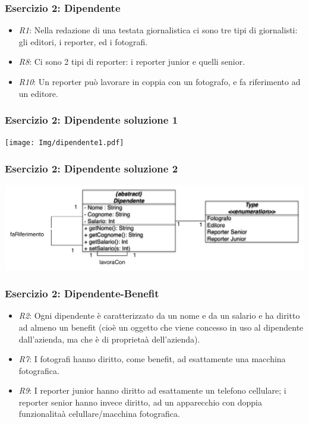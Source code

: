 \documentclass{beamer}
\begin{document}


\begin{frame}
\frametitle{Esercizio 2: Dipendente}
\begin{itemize}
\item \emph{R1}: Nella redazione di una testata giornalistica ci sono tre tipi di giornalisti: gli editori, i reporter, ed i fotografi.
\item \emph{R8}: Ci sono 2 tipi di reporter: i reporter junior e quelli senior.
\item \emph{R10}: Un reporter pu\`o lavorare in coppia con un fotografo, e fa riferimento ad un editore.
\end{itemize}
\end{frame}

\begin{frame}
\frametitle{Esercizio 2: Dipendente soluzione 1}
\texttt{[image: Img/dipendente1.pdf]}\\
\end{frame}

\begin{frame}
\frametitle{Esercizio 2: Dipendente soluzione 2}
\includegraphics[scale=0.4]{Img/dipendente2.pdf}\\
\end{frame}


\begin{frame}
\frametitle{Esercizio 2: Dipendente-Benefit}
\begin{itemize}
\item \emph{R2}: Ogni dipendente \`e caratterizzato da un nome e da un salario e ha diritto ad almeno un benefit (cio\`e un oggetto che viene concesso in uso al dipendente dall'azienda, ma che \`e di proprieta\`a dell'azienda).
\item \emph{R7}: I fotografi hanno diritto, come benefit, ad esattamente una macchina fotografica.
\item \emph{R9}: I reporter junior hanno diritto ad esattamente un telefono cellulare; i reporter senior hanno invece diritto, ad un apparecchio con doppia funzionalita\`a celullare/macchina fotografica.
\end{itemize}
\end{frame}
\end{document}
